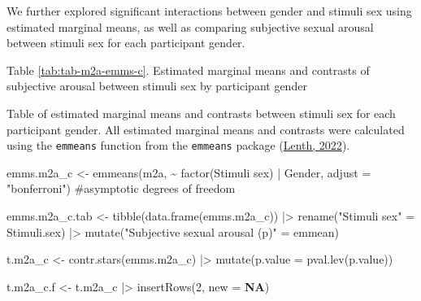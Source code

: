 \documentclass[
  bookmarksnumbered]{article}
\newenvironment{Shaded}{\begin{snugshade}}{\end{snugshade}}
\newcommand{\AttributeTok}[1]{\textcolor[rgb]{0.80,0.80,0.80}{#1}}
\newcommand{\CommentTok}[1]{\textcolor[rgb]{0.50,0.62,0.50}{#1}}
\newcommand{\ConstantTok}[1]{\textcolor[rgb]{0.86,0.64,0.64}{\textbf{#1}}}
\newcommand{\DecValTok}[1]{\textcolor[rgb]{0.86,0.86,0.80}{#1}}
\newcommand{\FunctionTok}[1]{\textcolor[rgb]{0.94,0.94,0.56}{#1}}
\newcommand{\NormalTok}[1]{\textcolor[rgb]{0.80,0.80,0.80}{#1}}
\newcommand{\OtherTok}[1]{\textcolor[rgb]{0.94,0.94,0.56}{#1}}
\newcommand{\SpecialCharTok}[1]{\textcolor[rgb]{0.86,0.64,0.64}{#1}}
\newcommand{\StringTok}[1]{\textcolor[rgb]{0.80,0.58,0.58}{#1}}
\begin{document}
We further explored significant interactions between gender and stimuli sex using estimated marginal means, as well as comparing subjective sexual arousal between stimuli sex for each participant gender.

Table \ref{tab:tab-m2a-emms-c}. Estimated marginal means and contrasts of subjective arousal between stimuli sex by participant gender

Table of estimated marginal means and contrasts between stimuli sex for each participant gender. All estimated marginal means and contrasts were calculated using the \texttt{emmeans} function from the \texttt{emmeans} package (\protect\hyperlink{ref-emmeanscit}{Lenth, 2022}).

\begin{Shaded}
\begin{Highlighting}[]
\NormalTok{emms.m2a\_c }\OtherTok{\textless{}{-}} \FunctionTok{emmeans}\NormalTok{(m2a, }\SpecialCharTok{\textasciitilde{}} \FunctionTok{factor}\NormalTok{(}\StringTok{\textasciigrave{}}\AttributeTok{Stimuli sex}\StringTok{\textasciigrave{}}\NormalTok{) }\SpecialCharTok{|}\NormalTok{ Gender,}
                    \AttributeTok{adjust =} \StringTok{"bonferroni"}\NormalTok{) }\CommentTok{\#asymptotic degrees of freedom}

\NormalTok{emms.m2a\_c.tab }\OtherTok{\textless{}{-}} \FunctionTok{tibble}\NormalTok{(}\FunctionTok{data.frame}\NormalTok{(emms.m2a\_c)) }\SpecialCharTok{|\textgreater{}}
  \FunctionTok{rename}\NormalTok{(}\StringTok{"Stimuli sex"} \OtherTok{=}\NormalTok{ Stimuli.sex) }\SpecialCharTok{|\textgreater{}} 
  \FunctionTok{mutate}\NormalTok{(}\StringTok{"Subjective sexual arousal (p)"} \OtherTok{=}\NormalTok{ emmean)}

\NormalTok{t.m2a\_c }\OtherTok{\textless{}{-}} \FunctionTok{contr.stars}\NormalTok{(emms.m2a\_c) }\SpecialCharTok{|\textgreater{}} 
  \FunctionTok{mutate}\NormalTok{(}\AttributeTok{p.value =} \FunctionTok{pval.lev}\NormalTok{(p.value))}

\NormalTok{t.m2a\_c.f }\OtherTok{\textless{}{-}}\NormalTok{ t.m2a\_c }\SpecialCharTok{|\textgreater{}} 
  \FunctionTok{insertRows}\NormalTok{(}\DecValTok{2}\NormalTok{, }\AttributeTok{new =} \ConstantTok{NA}\NormalTok{)}


\end{Highlighting}
\end{Shaded}
\end{document}
